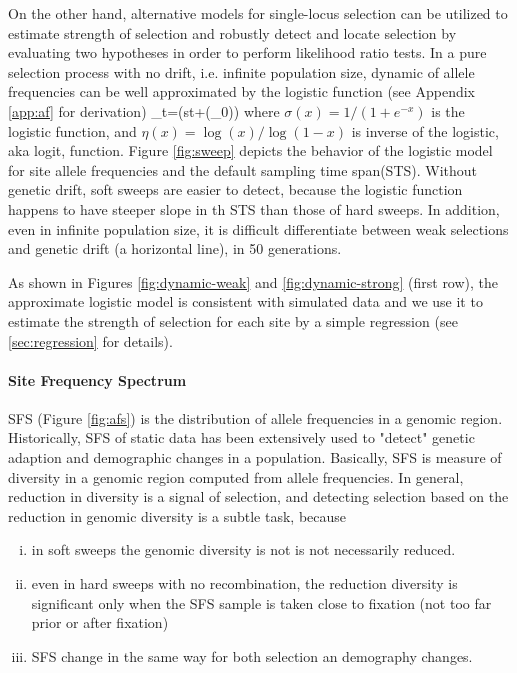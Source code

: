 \documentclass[11pt]{article}
\begin{document}
On the other hand, alternative models for single-locus selection can be 
utilized to estimate strength of selection and robustly 
detect and locate selection by 
evaluating two hypotheses in order to perform likelihood ratio tests.
In a pure selection process with no drift, i.e. infinite 
population size, 
dynamic of allele frequencies 
can be well approximated by the logistic function (see 
Appendix \ref{app:af} 
for 
derivation)
\beq
\nu_t=\sigma(st+\eta(\nu_0))\label{eq:nut}
\eeq
where $\sigma(x)=1/(1+e^{-x})$ is the logistic function, and 
$\eta(x)=\log(x)/\log(1-x)$ is inverse of the 
logistic, aka logit, function. Figure \ref{fig:sweep} depicts 
the behavior of 
the logistic model for site allele frequencies and the 
default sampling time 
span(STS). Without genetic drift, soft sweeps are easier to 
detect, 
because the logistic function happens to have steeper slope 
in th STS than 
those of hard sweeps. In addition, even in infinite 
population size, it is 
difficult differentiate between weak selections and genetic 
drift (a horizontal 
line), in 50 generations.


As shown in Figures \ref{fig:dynamic-weak} and \ref{fig:dynamic-strong} (first 
row), the approximate logistic model is consistent with 
simulated data and we 
use it to estimate the strength of selection for 
each site by a simple regression (see \ref{sec:regression} 
for details).



\paragraph{Site Frequency Spectrum} SFS (Figure 
\ref{fig:afs}) is the 
distribution of allele 
frequencies in a genomic region.
Historically, SFS of static data has been extensively used to 
"detect" genetic 
adaption and demographic changes in a population. Basically, 
SFS is measure of diversity in a genomic region computed from allele 
frequencies. 
In general, reduction in diversity is a signal of 
selection, and detecting selection based on the reduction in 
genomic diversity is a subtle task, because 
\begin{enumerate}[(i)]
	\item  in soft sweeps the genomic diversity is not is not 
	necessarily 
	reduced.
	\item even in hard sweeps with no recombination, the 
	reduction diversity is 
	significant only when the SFS sample is taken close to 
	fixation (not too 
	far prior or after fixation)
	\item SFS change in the same way for both selection an 
	demography changes. 
\end{enumerate}
\end{document}
